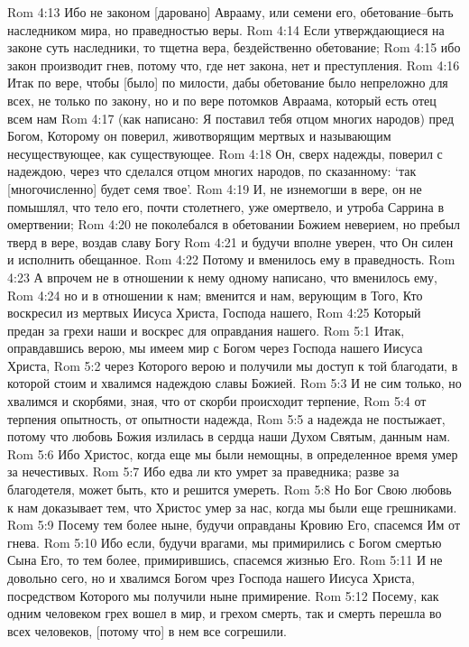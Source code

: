 Rom 4:13  Ибо не законом [даровано] Аврааму, или семени его, обетование--быть наследником мира, но праведностью веры.
Rom 4:14  Если утверждающиеся на законе суть наследники, то тщетна вера, бездейственно обетование;
Rom 4:15  ибо закон производит гнев, потому что, где нет закона, нет и преступления.
Rom 4:16  Итак по вере, чтобы [было] по милости, дабы обетование было непреложно для всех, не только по закону, но и по вере потомков Авраама, который есть отец всем нам
Rom 4:17  (как написано: Я поставил тебя отцом многих народов) пред Богом, Которому он поверил, животворящим мертвых и называющим несуществующее, как существующее.
Rom 4:18  Он, сверх надежды, поверил с надеждою, через что сделался отцом многих народов, по сказанному: `так [многочисленно] будет семя твое'.
Rom 4:19  И, не изнемогши в вере, он не помышлял, что тело его, почти столетнего, уже омертвело, и утроба Саррина в омертвении;
Rom 4:20  не поколебался в обетовании Божием неверием, но пребыл тверд в вере, воздав славу Богу
Rom 4:21  и будучи вполне уверен, что Он силен и исполнить обещанное.
Rom 4:22  Потому и вменилось ему в праведность.
Rom 4:23  А впрочем не в отношении к нему одному написано, что вменилось ему,
Rom 4:24  но и в отношении к нам; вменится и нам, верующим в Того, Кто воскресил из мертвых Иисуса Христа, Господа нашего,
Rom 4:25  Который предан за грехи наши и воскрес для оправдания нашего.
Rom 5:1  Итак, оправдавшись верою, мы имеем мир с Богом через Господа нашего Иисуса Христа,
Rom 5:2  через Которого верою и получили мы доступ к той благодати, в которой стоим и хвалимся надеждою славы Божией.
Rom 5:3  И не сим только, но хвалимся и скорбями, зная, что от скорби происходит терпение,
Rom 5:4  от терпения опытность, от опытности надежда,
Rom 5:5  а надежда не постыжает, потому что любовь Божия излилась в сердца наши Духом Святым, данным нам.
Rom 5:6  Ибо Христос, когда еще мы были немощны, в определенное время умер за нечестивых.
Rom 5:7  Ибо едва ли кто умрет за праведника; разве за благодетеля, может быть, кто и решится умереть.
Rom 5:8  Но Бог Свою любовь к нам доказывает тем, что Христос умер за нас, когда мы были еще грешниками.
Rom 5:9  Посему тем более ныне, будучи оправданы Кровию Его, спасемся Им от гнева.
Rom 5:10  Ибо если, будучи врагами, мы примирились с Богом смертью Сына Его, то тем более, примирившись, спасемся жизнью Его.
Rom 5:11  И не довольно сего, но и хвалимся Богом чрез Господа нашего Иисуса Христа, посредством Которого мы получили ныне примирение.
Rom 5:12  Посему, как одним человеком грех вошел в мир, и грехом смерть, так и смерть перешла во всех человеков, [потому что] в нем все согрешили.
